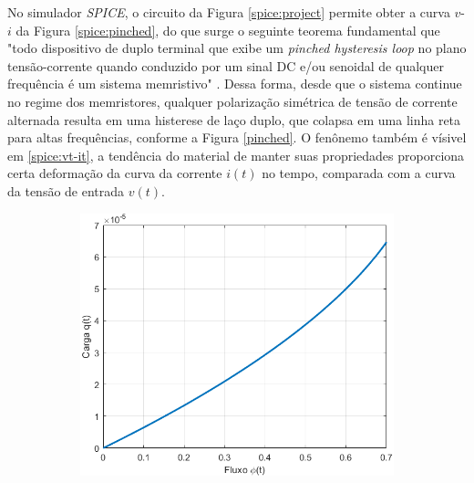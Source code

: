 \documentclass{ceel}
\begin{document}
\begin{multicols}{2}
No simulador \emph{SPICE}, o circuito da Figura \ref{spice:project} permite obter a curva $v$-$i$ da Figura \ref{spice:pinched}, do que surge o seguinte teorema fundamental que "todo dispositivo de duplo terminal que exibe um \emph{pinched hysteresis loop} no plano tensão-corrente quando conduzido por um sinal DC e/ou senoidal de qualquer frequência é um sistema memristivo" \cite{you}. Dessa forma, desde que o sistema continue no regime dos memristores, qualquer polarização simétrica de tensão de corrente alternada resulta em uma histerese de laço duplo, que colapsa em uma linha reta para altas frequências, conforme a Figura \ref{pinched}. O fenônemo também é vísivel em \ref{spice:vt-it}, a tendência do material de manter suas propriedades proporciona certa deformação da curva da corrente $i(t)$ no tempo, comparada com a curva da tensão de entrada $v(t)$.
\begin{figure}[ht]
\hspace{-0.38cm}
\begin{subfigure}{0.33\textwidth}
\includegraphics[width=\columnwidth]{m-fluxo-carga}
\caption{} \label{flux-charge}
\end{subfigure}\hspace{0.3cm}
\begin{subfigure}{0.315\textwidth}

\end{subfigure}
\end{figure}
\end{multicols}
\end{document}
